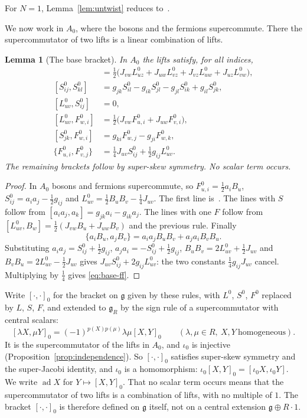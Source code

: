 \documentclass[11pt]{article}
\numberwithin{equation}{section}
\newtheorem{lemma}[theorem]{Lemma}
\theoremstyle{definition}
\theoremstyle{remark}
\newcommand{\ad}{\operatorname{ad}}
\begin{document}
For $N=1$, Lemma~\ref{lem:untwist} reduces to~\cite[Lemma~2.2]{Aoi26}.

We now work in $A_0$, where the bosons and the fermions supercommute. There the
supercommutator of two lifts is a linear combination of lifts.

\begin{lemma}[The base bracket]\label{lem:base}
In $A_0$ the lifts satisfy, for all indices,
\begin{align}
 [L^0_{uv},L^0_{wz}]&=\tfrac12\bigl(J_{vw}L^0_{uz}+J_{uw}L^0_{vz}+J_{vz}L^0_{uw}
   +J_{uz}L^0_{vw}\bigr),\label{eq:base-ll}\\
 [S^0_{ij},S^0_{kl}]&=g_{jk}S^0_{il}-g_{ik}S^0_{jl}-g_{jl}S^0_{ik}+g_{il}S^0_{jk},
   \label{eq:base-ss}\\
 [L^0_{uv},S^0_{ij}]&=0,\label{eq:base-ls}\\
 [L^0_{uv},F^0_{w,i}]&=\tfrac12\bigl(J_{vw}F^0_{u,i}+J_{uw}F^0_{v,i}\bigr),
   \label{eq:base-lf}\\
 [S^0_{jk},F^0_{w,i}]&=g_{ki}F^0_{w,j}-g_{ji}F^0_{w,k},\label{eq:base-sf}\\
 \{F^0_{u,i},F^0_{v,j}\}&=\tfrac14J_{uv}S^0_{ij}+\tfrac12g_{ij}L^0_{uv}.
   \label{eq:base-ff}
\end{align}
The remaining brackets follow by super-skew symmetry. No scalar term occurs.
\end{lemma}

\begin{proof}
In $A_0$ bosons and fermions supercommute, so
$F^0_{u,i}=\tfrac12a_iB_u$, $S^0_{ij}=a_ia_j-\tfrac12g_{ij}$ and
$L^0_{uv}=\tfrac12B_uB_v-\tfrac14J_{uv}$. The first line is~\cite[Lemma~2.3]{Aoi26}. The lines with $S$ follow from
$[a_ia_j,a_k]=g_{jk}a_i-g_{ik}a_j$. The lines with one $F$ follow from
$[L^0_{uv},B_w]=\tfrac12(J_{vw}B_u+J_{uw}B_v)$ and the previous rule. Finally
\[
 \{a_iB_u,a_jB_v\}=a_ia_jB_uB_v+a_ja_iB_vB_u .
\]
Substituting $a_ia_j=S^0_{ij}+\tfrac12g_{ij}$, $a_ja_i=-S^0_{ij}+\tfrac12g_{ij}$,
$B_uB_v=2L^0_{uv}+\tfrac12J_{uv}$ and $B_vB_u=2L^0_{uv}-\tfrac12J_{uv}$ gives
$J_{uv}S^0_{ij}+2g_{ij}L^0_{uv}$: the two constants $\tfrac14g_{ij}J_{uv}$ cancel.
Multiplying by $\tfrac14$ gives \eqref{eq:base-ff}.
\end{proof}

Write $[\cdot,\cdot]_0$ for the bracket on $\mathfrak g$ given by these rules, with $L^0$, $S^0$,
$F^0$ replaced by $L$, $S$, $F$, and extended to
$\mathfrak g_R$ by the sign rule of a supercommutator with central scalars:
\[
 [\lambda X,\mu Y]_0=(-1)^{p(X)p(\mu)}\lambda\mu[X,Y]_0\qquad(\lambda,\mu\in R,\ X,Y\ \text{homogeneous}).
\]
It is the
supercommutator of the lifts in $A_0$, and $\iota_0$ is injective
(Proposition~\ref{prop:independence}). So $[\cdot,\cdot]_0$ satisfies super-skew symmetry and the
super-Jacobi identity, and $\iota_0$ is a homomorphism: $\iota_0[X,Y]_0=[\iota_0X,\iota_0Y]$.
We write $\ad X$ for $Y\mapsto[X,Y]_0$. That no scalar term occurs means that the
supercommutator of two lifts is a combination of lifts, with no multiple of $1$. The
bracket $[\cdot,\cdot]_0$ is therefore defined on $\mathfrak g$ itself, not on a central
extension $\mathfrak g\oplus R\cdot1$.
\end{document}
